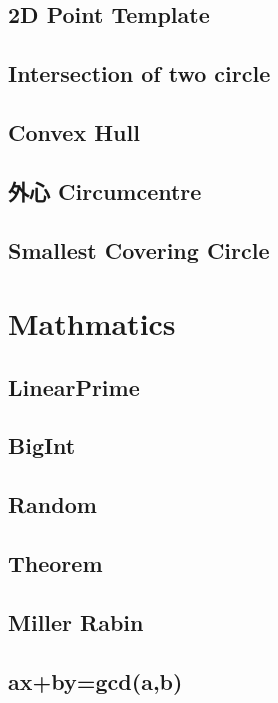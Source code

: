 \subsection{2D Point Template}

\subsection{Intersection of two circle}

\subsection{Convex Hull}

\subsection{外心 Circumcentre}

\subsection{Smallest Covering Circle}


\section{Mathmatics}

\subsection{LinearPrime}

\subsection{BigInt}

\subsection{Random}

\subsection{Theorem}

\subsection{Miller Rabin}

\subsection{ax+by=gcd(a,b)}

